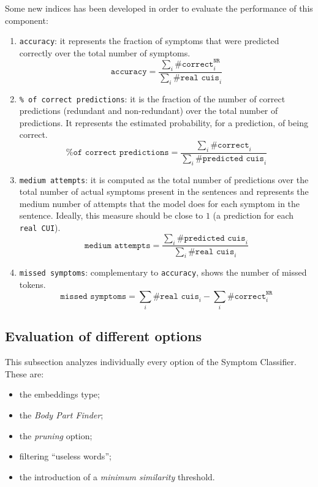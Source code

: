 Some new indices has been developed in order to evaluate the performance of this component:
\begin{enumerate}

  \item \texttt{accuracy}: it represents the fraction of symptoms that were predicted correctly over the total number of symptoms.
  \begin{equation}
  \texttt{accuracy} = \frac{\sum_{i}{\texttt{\#correct}_{i}^{\texttt{NR}}}}{\sum_{i}{\texttt{\#real cuis}_{i}}}
  \end{equation}

  \item \texttt{\% of correct predictions}: it is the fraction of the number of correct predictions (redundant and non-redundant) over the total number of predictions. It represents the estimated probability, for a prediction, of being correct.
  \begin{equation}
  \texttt{\% of correct predictions} = \frac{\sum_{i}{\texttt{\#correct}_{i}}}{\sum_{i}{\texttt{\#predicted cuis}_{i}}}
  \end{equation}

  \item \texttt{medium attempts}: it is computed as the total number of predictions over the total number of actual symptoms present in the sentences and represents the medium number of attempts that the model does for each symptom in the sentence. Ideally, this measure should be close to $1$ (a prediction for each \texttt{real CUI}).
  \begin{equation}
  \texttt{medium attempts} = \frac{\sum_{i}{\texttt{\#predicted cuis}_{i}}}{\sum_{i}{\texttt{\#real cuis}_{i}}}
  \end{equation}

  \item \texttt{missed symptoms}: complementary to \texttt{accuracy}, shows the number of missed tokens.
  \begin{equation}
  \texttt{missed symptoms} = \sum_{i}{\texttt{\#real cuis}_{i}} - \sum_{i}{\texttt{\#correct}^{\texttt{NR}}_{i}}
  \end{equation}

\end{enumerate}

\newpage
\subsection{Evaluation of different options}
\label{sec:evaluationoptions}
This subsection analyzes individually every option of the Symptom Classifier. These are: 
\begin{itemize}
  \item the embeddings type;
  \item the \textit{Body Part Finder};
  \item the \textit{pruning} option;
  \item filtering ``useless words'';
  \item the introduction of a \textit{minimum similarity} threshold.
\end{itemize}

